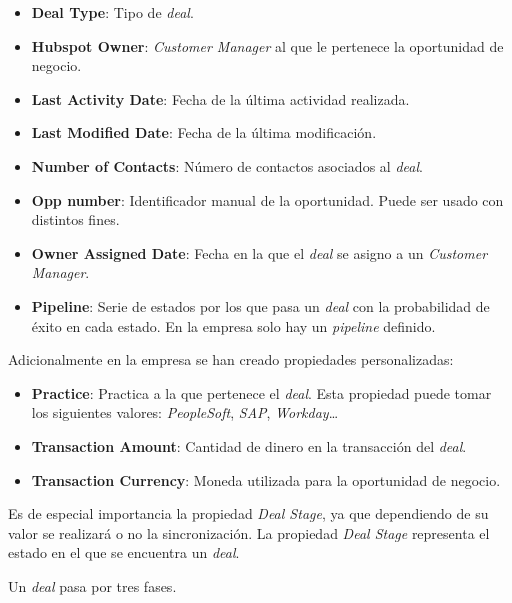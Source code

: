 \begin{itemize}
			\item \textbf{Deal Type}: Tipo de \textit{deal}.
			\item \textbf{Hubspot Owner}: \textit{Customer Manager} al que le pertenece la oportunidad de negocio.
			\item \textbf{Last Activity Date}: Fecha de la última actividad realizada.
			\item \textbf{Last Modified Date}: Fecha de la última modificación.
			\item \textbf{Number of Contacts}: Número de contactos asociados al \textit{deal}.
			\item \textbf{Opp number}: Identificador manual de la oportunidad. Puede ser usado con distintos fines.
			\item \textbf{Owner Assigned Date}: Fecha en la que el \textit{deal} se asigno a un \textit{Customer Manager}.
			\item \textbf{Pipeline}: Serie de estados por los que pasa un \textit{deal} con la probabilidad de éxito en cada estado. En la empresa solo hay un \textit{pipeline} definido.
		\end{itemize}


		Adicionalmente en la empresa se han creado propiedades personalizadas:
		
		\begin{itemize}
			\item \textbf{Practice}: Practica a la que pertenece el \textit{deal}. Esta propiedad puede tomar los siguientes valores: \textit{PeopleSoft}, \textit{SAP}, \textit{Workday}\ldots
			\item \textbf{Transaction Amount}: Cantidad de dinero en la transacción del \textit{deal}. 
			\item \textbf{Transaction Currency}: Moneda utilizada para la oportunidad de negocio.
		\end{itemize}
		
		
		Es de especial importancia la propiedad \textit{Deal Stage}, ya que dependiendo de su valor se realizará o no la sincronización.
		La propiedad \textit{Deal Stage} representa el estado en el que se encuentra un \textit{deal}.
		
		
		
		
		
		Un \textit{deal} pasa por tres fases.
		
